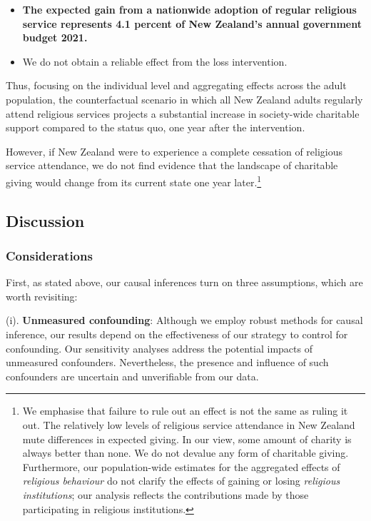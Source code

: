\documentclass[
  single column]{article}
\providecommand{\tightlist}{%
  \setlength{\itemsep}{0pt}\setlength{\parskip}{0pt}}\usepackage{longtable,booktabs,array}
\begin{document}
\begin{itemize}
\tightlist
\item
  \textbf{The expected gain from a nationwide adoption of regular
  religious service represents 4.1 percent of New Zealand's annual
  government budget 2021.}
\item
  We do not obtain a reliable effect from the loss intervention.
\end{itemize}

Thus, focusing on the individual level and aggregating effects across
the adult population, the counterfactual scenario in which all New
Zealand adults regularly attend religious services projects a
substantial increase in society-wide charitable support compared to the
status quo, one year after the intervention.

However, if New Zealand were to experience a complete cessation of
religious service attendance, we do not find evidence that the landscape
of charitable giving would change from its current state one year
later.\footnote{We emphasise that failure to rule out an effect is not
  the same as ruling it out. The relatively low levels of religious
  service attendance in New Zealand mute differences in expected giving.
  In our view, some amount of charity is always better than none. We do
  not devalue any form of charitable giving. Furthermore, our
  population-wide estimates for the aggregated effects of
  \emph{religious behaviour} do not clarify the effects of gaining or
  losing \emph{religious institutions}; our analysis reflects the
  contributions made by those participating in religious institutions.}

\subsection{Discussion}\label{discussion}

\subsubsection{Considerations}\label{considerations}

First, as stated above, our causal inferences turn on three assumptions,
which are worth revisiting:

(i). \textbf{Unmeasured confounding}: Although we employ robust methods
for causal inference, our results depend on the effectiveness of our
strategy to control for confounding. Our sensitivity analyses address
the potential impacts of unmeasured confounders. Nevertheless, the
presence and influence of such confounders are uncertain and
unverifiable from our data.
\end{document}
